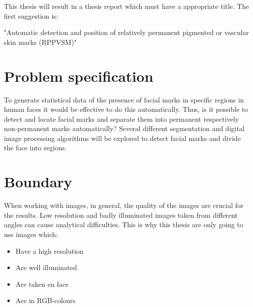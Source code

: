 \documentclass{article}
\begin{document}
This thesis will result in a thesis report which must have a appropriate title. The first suggestion is: 

\begin{displayquote}
"Automatic detection and position of relatively permanent pigmented or vascular skin marks (RPPVSM)"
\end{displayquote}

\section{Problem specification}

To generate statistical data of the presence of facial marks in specific regions in human faces it would be effective to do this automatically. Thus, is it possible to detect and locate facial marks and separate them into permanent respectively non-permanent marks automatically? Several different segmentation and digital image processing algorithms will be explored to detect facial marks and divide the face into regions. 

\section{Boundary}

When working with images, in general, the quality of the images are crucial for the results. Low resolution and badly illuminated images taken from different angles can cause analytical difficulties. This is why this thesis are only going to use images which:

\begin{itemize}
	\item Have a high resolution
	\item Are well illuminated
	\item Are taken en face
	\item Are in RGB-colours 
\end{itemize}









\newpage


\end{document}
